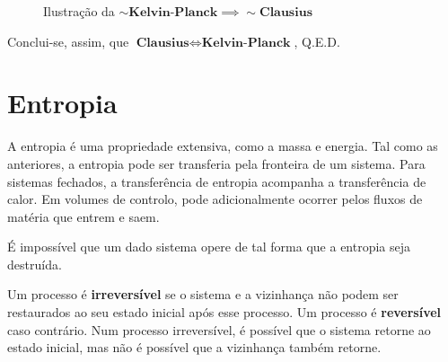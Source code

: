 \begin{itemize}
\begin{figure}[H]
        \caption{Ilustração da $\sim \textbf{Kelvin-Planck} \implies \sim \textbf{Clausius}$}
        \label{fig:eq-kelvin-clausius}
    \end{figure}

\end{itemize}

Conclui-se, assim, que $\textbf{Clausius} \Longleftrightarrow \textbf{Kelvin-Planck}$, Q.E.D.

\section{Entropia}

A entropia é uma propriedade extensiva, como a massa e energia. Tal como as anteriores, a entropia pode ser transferia pela fronteira de um sistema. Para sistemas fechados, a transferência de entropia acompanha a transferência de calor. Em volumes de controlo, pode adicionalmente ocorrer pelos fluxos de matéria que entrem e saem.

\begin{theorem}[Entropia]
    É impossível que um dado sistema opere de tal forma que a entropia seja destruída.
\end{theorem}

Um processo é \textbf{irreversível} se o sistema e a vizinhança não podem ser restaurados ao seu estado inicial após esse processo. Um processo é \textbf{reversível} caso contrário. Num processo irreversível, é possível que o sistema retorne ao estado inicial, mas não é possível que a vizinhança também retorne.


